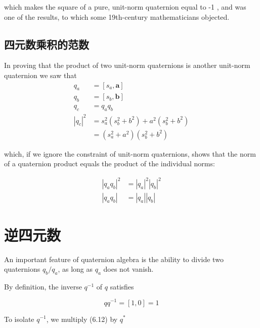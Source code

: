     which makes the square of a pure, unit-norm quaternion equal to -1 , and was one of the results, to which some 19th-century mathematicians objected.

    \subsection{四元数乘积的范数}
    In proving that the product of two unit-norm quaternions is another unit-norm quaternion we saw that
    $$
        \begin{aligned}
            q_{a}                  & =\left[s_{a}, \mathbf{a}\right]                                          \\
            q_{b}                  & =\left[s_{b}, \mathbf{b}\right]                                          \\
            q_{c}                  & =q_{a} q_{b}                                                             \\
            \left|q_{c}\right|^{2} & =s_{a}^{2}\left(s_{b}^{2}+b^{2}\right)+a^{2}\left(s_{b}^{2}+b^{2}\right) \\
                                   & =\left(s_{a}^{2}+a^{2}\right)\left(s_{b}^{2}+b^{2}\right)
        \end{aligned}
    $$

    which, if we ignore the constraint of unit-norm quaternions, shows that the norm of a quaternion product equals the product of the individual norms:

    $$
        \begin{aligned}
            \left|q_{a} q_{b}\right|^{2} & =\left|q_{a}\right|^{2}\left|q_{b}\right|^{2} \\
            \left|q_{a} q_{b}\right|     & =\left|q_{a}\right|\left|q_{b}\right|
        \end{aligned}
    $$

    \section{逆四元数}
    An important feature of quaternion algebra is the ability to divide two quaternions $q_{b} / q_{a}$, as long as $q_{a}$ does not vanish.

    By definition, the inverse $q^{-1}$ of $q$ satisfies

    $$
        q q^{-1}=[1,0]=1
    $$

    To isolate $q^{-1}$, we multiply (6.12) by $q^{*}$

